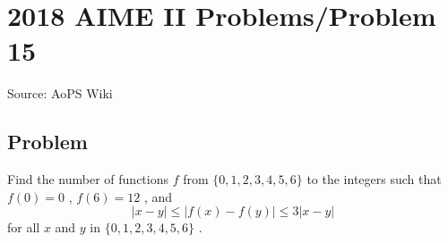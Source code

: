 \documentclass[12pt]{article}
\begin{document}
\section*{{2018 AIME II Problems/Problem 15}}
Source: AoPS Wiki

\subsection*{Problem}
Find the number of functions $f$ from $\{0, 1, 2, 3, 4, 5, 6\}$ to the integers such that $f(0) = 0$ , $f(6) = 12$ , and \[|x - y| \leq |f(x) - f(y)| \leq 3|x - y|\] for all $x$ and $y$ in $\{0, 1, 2, 3, 4, 5, 6\}$ .
\end{document}
